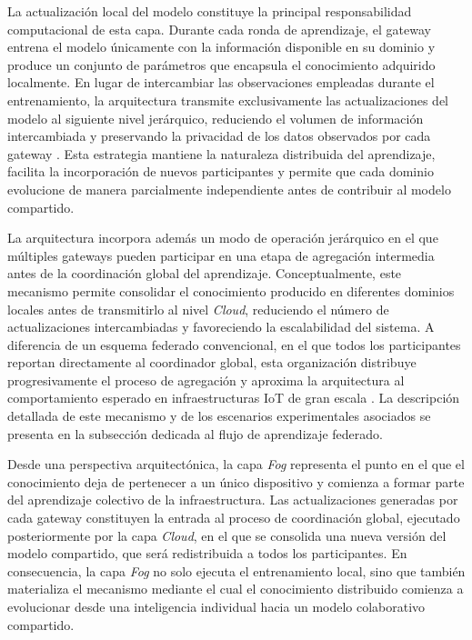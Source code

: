 \documentclass[journal,article,submit,moreauthors]{Definitions/mdpi}
\begin{document}
La actualización local del modelo constituye la principal responsabilidad computacional de esta capa. Durante cada ronda de aprendizaje, el gateway entrena el modelo únicamente con la información disponible en su dominio y produce un conjunto de parámetros que encapsula el conocimiento adquirido localmente. En lugar de intercambiar las observaciones empleadas durante el entrenamiento, la arquitectura transmite exclusivamente las actualizaciones del modelo al siguiente nivel jerárquico, reduciendo el volumen de información intercambiada y preservando la privacidad de los datos observados por cada gateway \cite{Hajj2023,Chaurasia2024,Ficco2024,Ma2024,Cooray2025}. Esta estrategia mantiene la naturaleza distribuida del aprendizaje, facilita la incorporación de nuevos participantes y permite que cada dominio evolucione de manera parcialmente independiente antes de contribuir al modelo compartido.

La arquitectura incorpora además un modo de operación jerárquico en el que múltiples gateways pueden participar en una etapa de agregación intermedia antes de la coordinación global del aprendizaje. Conceptualmente, este mecanismo permite consolidar el conocimiento producido en diferentes dominios locales antes de transmitirlo al nivel \textit{Cloud}, reduciendo el número de actualizaciones intercambiadas y favoreciendo la escalabilidad del sistema. A diferencia de un esquema federado convencional, en el que todos los participantes reportan directamente al coordinador global, esta organización distribuye progresivamente el proceso de agregación y aproxima la arquitectura al comportamiento esperado en infraestructuras IoT de gran escala \cite{Ma2024,Tran2026}. La descripción detallada de este mecanismo y de los escenarios experimentales asociados se presenta en la subsección dedicada al flujo de aprendizaje federado.

Desde una perspectiva arquitectónica, la capa \textit{Fog} representa el punto en el que el conocimiento deja de pertenecer a un único dispositivo y comienza a formar parte del aprendizaje colectivo de la infraestructura. Las actualizaciones generadas por cada gateway constituyen la entrada al proceso de coordinación global, ejecutado posteriormente por la capa \textit{Cloud}, en el que se consolida una nueva versión del modelo compartido, que será redistribuida a todos los participantes. En consecuencia, la capa \textit{Fog} no solo ejecuta el entrenamiento local, sino que también materializa el mecanismo mediante el cual el conocimiento distribuido comienza a evolucionar desde una inteligencia individual hacia un modelo colaborativo compartido.
\end{document}
